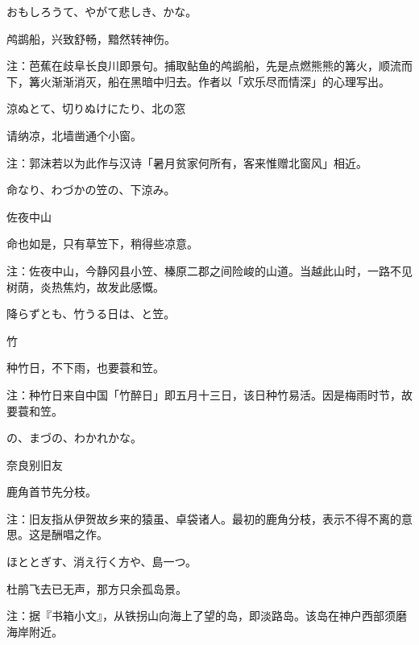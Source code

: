 \begin{haiku}
    {\FH おもしろうて、やがて悲しき、かな。}

    {\FK 鸬鹚船，兴致舒畅，黯然转神伤。}

    {\FT 注：芭蕉在歧阜长良川即景句。捕取鲇鱼的鸬鹚船，先是点燃熊熊的篝火，顺流而下，篝火渐渐消灭，船在黑暗中归去。作者以「欢乐尽而情深」的心理写出。}
\end{haiku}

\begin{haiku}
    {\FH 涼ぬとて、切りぬけにたり、北の窓}

    {\FK 请纳凉，北墙凿通个小窗。}

    {\FT 注：郭沫若以为此作与汉诗「暑月贫家何所有，客来惟赠北窗风」相近。}
\end{haiku}

\begin{haiku}
    {\FH 命なり、わづかの笠の、下涼み。}

    {\FK 佐夜中山}

    {\FK 命也如是，只有草笠下，稍得些凉意。}

    {\FT 注：佐夜中山，今静冈县小笠、榛原二郡之间险峻的山道。当越此山时，一路不见树荫，炎热焦灼，故发此感慨。}
\end{haiku}

\begin{haiku}
    {\FH 降らずとも、竹うる日は、と笠。}

    {\FK 竹}

    {\FK 种竹日，不下雨，也要蓑和笠。}

    {\FT 注：种竹日来自中国「竹醉日」即五月十三日，该日种竹易活。因是梅雨时节，故要蓑和笠。}
\end{haiku}

\begin{haiku}
    {\FH {}の、まづの、わかれかな。}

    {\FK 奈良别旧友}

    {\FK 鹿角首节先分枝。}

    {\FT 注：旧友指从伊贺故乡来的猿虽、卓袋诸人。最初的鹿角分枝，表示不得不离的意思。这是酬唱之作。}
\end{haiku}

\begin{haiku}
    {\FH ほととぎす、消え行く方や、島一つ。}

    {\FK 杜鹃飞去已无声，那方只余孤岛景。}

    {\FT 注：据『书箱小文』，从铁拐山向海上了望的岛，即淡路岛。该岛在神户西部须磨海岸附近。}
\end{haiku}

